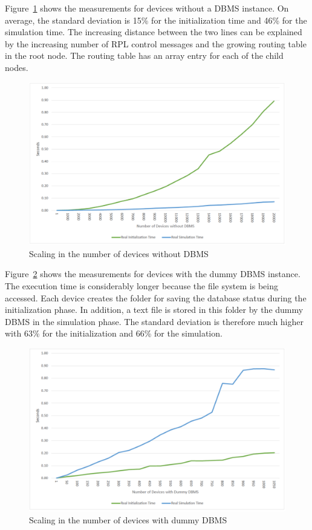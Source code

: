 \documentclass[english,version-2019-11]{uzl-thesis}
\begin{document}
Figure~\ref{figure_evaluation_starPerf_Without} shows the measurements for devices without a DBMS instance. On average, the standard deviation is 15\% for the initialization time and 46\% for the simulation time. The increasing distance between the two lines can be explained by the increasing number of RPL control messages and the growing routing table in the root node. The routing table has an array entry for each of the child nodes.
\begin{figure}[htpb]
  \centering
  \includegraphics[scale=0.5]{figure_evaluation_starPerf_Without.pdf}
  \caption{Scaling in the number of devices without DBMS}
  \label{figure_evaluation_starPerf_Without}
\end{figure}


Figure~\ref{figure_evaluation_starPerf_Dummy} shows the measurements for devices with the dummy DBMS instance. The execution time is considerably longer because the file system is being accessed. Each device creates the folder for saving the database status during the initialization phase. In addition, a text file is stored in this folder by the dummy DBMS in the simulation phase. The standard deviation is therefore much higher with 63\% for the initialization and 66\% for the simulation.
\begin{figure}[htpb]
  \centering
  \includegraphics[scale=0.5]{figure_evaluation_starPerf_Dummy.pdf}
  \caption{Scaling in the number of devices with dummy DBMS}
  \label{figure_evaluation_starPerf_Dummy}
\end{figure}
\end{document}
